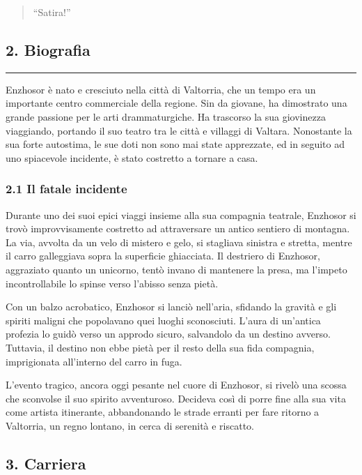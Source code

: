 \begin{quote}
``Satira!''
\end{quote}

\subsection{2. Biografia}\label{biografia}

\begin{center}\rule{0.5\linewidth}{0.5pt}\end{center}

Enzhosor è nato e cresciuto nella città di Valtorria, che un tempo era
un importante centro commerciale della regione. Sin da giovane, ha
dimostrato una grande passione per le arti drammaturgiche. Ha trascorso
la sua giovinezza viaggiando, portando il suo teatro tra le città e
villaggi di Valtara. Nonostante la sua forte autostima, le sue doti non
sono mai state apprezzate, ed in seguito ad uno spiacevole incidente, è
stato costretto a tornare a casa.

\subsubsection{2.1 Il fatale incidente}\label{il-fatale-incidente}

Durante uno dei suoi epici viaggi insieme alla sua compagnia teatrale,
Enzhosor si trovò improvvisamente costretto ad attraversare un antico
sentiero di montagna. La via, avvolta da un velo di mistero e gelo, si
stagliava sinistra e stretta, mentre il carro galleggiava sopra la
superficie ghiacciata. Il destriero di Enzhosor, aggraziato quanto un
unicorno, tentò invano di mantenere la presa, ma l'impeto
incontrollabile lo spinse verso l'abisso senza pietà.

Con un balzo acrobatico, Enzhosor si lanciò nell'aria, sfidando la
gravità e gli spiriti maligni che popolavano quei luoghi sconosciuti.
L'aura di un'antica profezia lo guidò verso un approdo sicuro,
salvandolo da un destino avverso. Tuttavia, il destino non ebbe pietà
per il resto della sua fida compagnia, imprigionata all'interno del
carro in fuga.

L'evento tragico, ancora oggi pesante nel cuore di Enzhosor, si rivelò
una scossa che sconvolse il suo spirito avventuroso. Decideva così di
porre fine alla sua vita come artista itinerante, abbandonando le strade
erranti per fare ritorno a Valtorria, un regno lontano, in cerca di
serenità e riscatto.

\subsection{3. Carriera}\label{carriera}

